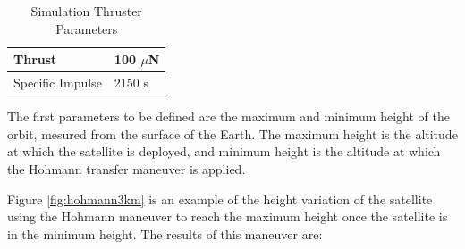 \begin{table}[h!]
\begin{center}
\begin{tabular}{ | l | l | }
\hline
Thrust & 100 $\mu$N \\ 
\hline 
Specific Impulse & 2150 s \\
\hline
\end{tabular}
\caption{Simulation Thruster Parameters}
\label{thrustspimpulse}
\end{center}
\end{table}

The first parameters to be defined are the maximum and minimum height of the orbit, mesured from the surface of the Earth. The maximum height is the altitude at which the satellite is deployed, and minimum height is the altitude at which the Hohmann transfer maneuver is applied.

Figure \ref{fig:hohmann3km} is an example of the height variation of the satellite using the Hohmann maneuver to reach the maximum height once the satellite is in the minimum height. The results of this maneuver are:

